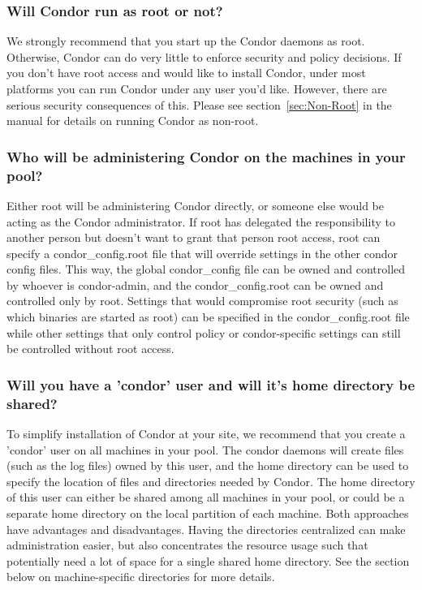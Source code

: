 \subsubsection{Will Condor run as root or not?}

We strongly recommend that you start up the Condor daemons as root.
Otherwise, Condor can do very little to enforce security and policy
decisions.  If you don't have root access and would like to install
Condor, under most platforms you can run Condor under any user you'd
like.  However, there are serious security consequences of this.
Please see section~\ref{sec:Non-Root} in the manual for
details on running Condor as non-root.

\subsubsection{ Who will be administering Condor on the machines in your pool?}

Either root will be administering Condor directly, or someone else
would be acting as the Condor administrator.  If root has delegated
the responsibility to another person but doesn't want to grant that
person root access, root can specify a condor\_config.root file that
will override settings in the other condor config files.  This way,
the global condor\_config file can be owned and controlled by whoever
is condor-admin, and the condor\_config.root can be owned and
controlled only by root.  Settings that would compromise root security
(such as which binaries are started as root) can be specified in the
condor\_config.root file while other settings that only control policy
or condor-specific settings can still be controlled without root
access.  

\subsubsection{Will you have a 'condor' user and will it's home directory be
   shared? }

To simplify installation of Condor at your site, we recommend that you
create a 'condor' user on all machines in your pool.  The condor
daemons will create files (such as the log files) owned by this user,
and the home directory can be used to specify the location of files
and directories needed by Condor.  The home directory of this user can
either be shared among all machines in your pool, or could be a
separate home directory on the local partition of each machine.  Both
approaches have advantages and disadvantages.  Having the directories
centralized can make administration easier, but also concentrates the
resource usage such that potentially need a lot of space for a single
shared home directory.  See the section below on machine-specific
directories for more details.

